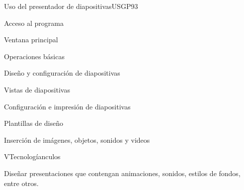 \begin{syllabus}
\begin{unit}{Uso del presentador de diapositivas}{USGP}{9}{3}
\begin{topics}
      \item Acceso al programa
      \item Ventana principal
      \item Operaciones básicas
      \item Diseño y configuración de diapositivas
      \item Vistas de diapositivas
      \item Configuración e impresión de diapositivas
      \item Plantillas de diseño 
      \item Inserción de imágenes, objetos, sonidos y videos
      \item VTecnologíanculos
\end{topics}
\begin{unitgoals}
   \item Diseñar presentaciones que contengan animaciones, sonidos, estilos de fondos, entre otros.
\end{unitgoals}
\end{unit}

\begin{coursebibliography}

\end{coursebibliography}

\end{syllabus}
